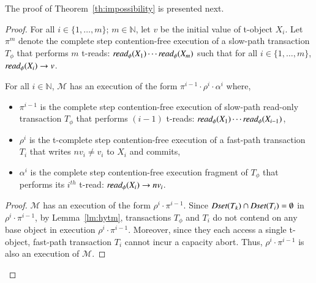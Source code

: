 %
The proof of Theorem~\ref{th:impossibility} is presented next.
%
\begin{proof}
	For all $i\in \{1,\ldots , m\}$; $m \in \mathbb{N}$, let 
	$v$ be the initial value of t-object $X_i$.
	Let $\pi^{m}$ denote the complete step contention-free execution of a slow-path transaction
	$T_{\phi}$ that performs ${m}$ t-reads: $\textit{read}_{\phi}(X_1)\cdots \textit{read}_{\phi}(X_{m})$
	such that for all $i\in \{1,\ldots , m \}$, $\textit{read}_{\phi}(X_i) \rightarrow v$.
	\begin{claim}
		\label{cl:readdap}
		For all $i\in \mathbb{N}$, $\mathcal{M}$ has an execution of the form $\pi^{i-1}\cdot \rho^i\cdot \alpha^i$ where,
		\begin{itemize}
			\item
			$\pi^{i-1}$ is the complete step contention-free execution of slow-path read-only transaction $T_{\phi}$ that performs
			$(i-1)$ t-reads: $\textit{read}_{\phi}(X_1)\cdots \textit{read}_{\phi}(X_{i-1})$,
			\item
			$\rho^i$ is the t-complete step contention-free execution of a fast-path transaction $T_{i}$
			that writes $nv_i\neq v_i$ to $X_i$ and commits,
			\item
			$\alpha^i$ is the complete step contention-free execution fragment of $T_{\phi}$ that performs its $i^{th}$ t-read:
			$\textit{read}_{\phi}(X_i) \rightarrow nv_i$.
		\end{itemize}
	\end{claim}
	\begin{proof}
		$\mathcal{M}$ has an execution of the form $\rho^i\cdot \pi^{i-1}$.
		Since $\textit{Dset}(T_k) \cap \textit{Dset}(T_{i}) =\emptyset$ in $\rho^i\cdot \pi^{i-1}$,
		by Lemma~\ref{lm:hytm}, transactions $T_{\phi}$ and $T_i$ do not contend
		on any base object in execution $\rho^i\cdot \pi^{i-1}$.
		Moreover, since they each access a single t-object, fast-path transaction $T_i$ cannot incur a capacity abort.
		Thus, $\rho^i\cdot \pi^{i-1}$ is also an execution of $\mathcal{M}$.
		

\end{proof}
\end{proof}
